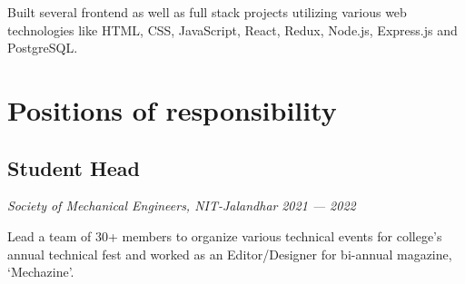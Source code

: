 \documentclass[a4paper]{article}
\begin{document}
Built several frontend as well as full stack projects utilizing various web technologies like HTML, CSS, JavaScript, React, Redux, Node.js, Express.js and PostgreSQL.


\section{Positions of responsibility}
\subsection{Student Head}
\textit{Society of Mechanical Engineers, NIT-Jalandhar}
\hfill
\textit{2021 --- 2022}

Lead a team of 30+ members to organize various technical events for college's annual technical fest and worked as an Editor/Designer for bi-annual magazine, `Mechazine'.
\end{document}

